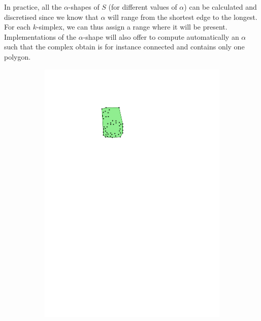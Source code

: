 In practice, all the $\alpha$-shapes of $S$ (for different values of $\alpha$) can be calculated and discretised since we know that $\alpha$ will range from the shortest edge to the longest.
For each $k$-simplex, we can thus assign a range where it will be present.
Implementations of the $\alpha$-shape will also offer to compute automatically an $\alpha$ such that the complex obtain is for instance connected and contains only one polygon.
\begin{figure}
  \centering
  \begin{subfigure}[b]{0.15\linewidth}
    \centering
    \includegraphics[page=1,width=\textwidth]{figs/alphashape.pdf}
    \caption{}
  \end{subfigure}
  \qquad 
  \begin{subfigure}[b]{0.15\linewidth}
    \centering

\end{subfigure}
\end{figure}
